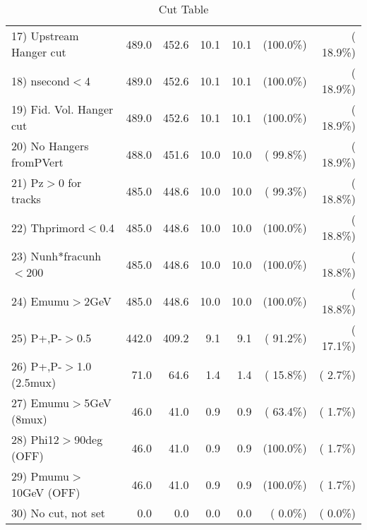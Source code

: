 \begin{table}[h!]
\begin{tabular}{||l||r|r|r|r|r|r||}
 17) Upstream Hanger cut  &        489.0 &        452.6 &         10.1 &         10.1 & (100.0\%) & ( 18.9\%) \\
 18) nsecond$<$4          &        489.0 &        452.6 &         10.1 &         10.1 & (100.0\%) & ( 18.9\%) \\
 19) Fid. Vol. Hanger cut &        489.0 &        452.6 &         10.1 &         10.1 & (100.0\%) & ( 18.9\%) \\
 20) No Hangers fromPVert &        488.0 &        451.6 &         10.0 &         10.0 & ( 99.8\%) & ( 18.9\%) \\
 21) Pz$>$0 for tracks    &        485.0 &        448.6 &         10.0 &         10.0 & ( 99.3\%) & ( 18.8\%) \\
 22) Thprimord$<$0.4      &        485.0 &        448.6 &         10.0 &         10.0 & (100.0\%) & ( 18.8\%) \\
 23) Nunh*fracunh$<$200   &        485.0 &        448.6 &         10.0 &         10.0 & (100.0\%) & ( 18.8\%) \\
 24) Emumu$>$2GeV         &        485.0 &        448.6 &         10.0 &         10.0 & (100.0\%) & ( 18.8\%) \\
 25) P+,P-$>$0.5          &        442.0 &        409.2 &          9.1 &          9.1 & ( 91.2\%) & ( 17.1\%) \\
 26) P+,P-$>$1.0 (2.5mux) &         71.0 &         64.6 &          1.4 &          1.4 & ( 15.8\%) & (  2.7\%) \\
 27) Emumu$>$5GeV  (8mux) &         46.0 &         41.0 &          0.9 &          0.9 & ( 63.4\%) & (  1.7\%) \\
 28) Phi12$>$90deg  (OFF) &         46.0 &         41.0 &          0.9 &          0.9 & (100.0\%) & (  1.7\%) \\
 29) Pmumu$>$10GeV  (OFF) &         46.0 &         41.0 &          0.9 &          0.9 & (100.0\%) & (  1.7\%) \\
 30) No cut, not set      &          0.0 &          0.0 &          0.0 &          0.0 & (  0.0\%) & (  0.0\%) \\
 \hline
 \hline
 \end{tabular}
 \caption{Cut Table           }
 \label{tab-cutheavy_neutrino_4.000}
 \end{table}
